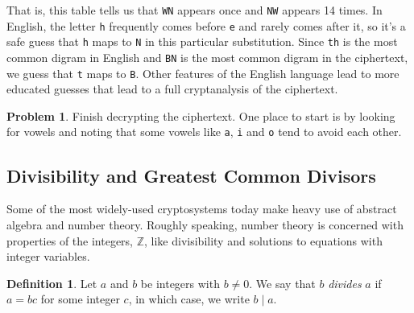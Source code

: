 \documentclass[12pt]{article}
\theoremstyle{plain}
\theoremstyle{definition}
\newtheorem{definition}[theorem]{Definition}
\newtheorem{problem}[theorem]{Problem}
\theoremstyle{remark}
\newcommand{\Z}{\mathbb{Z}}
\begin{document}
That is, this table tells us that \texttt{WN} appears once and \texttt{NW} appears 14 times.
In English, the letter \texttt{h} frequently comes before \texttt{e} and rarely comes after it, so it's a safe guess that \texttt{h} maps to \texttt{N} in this particular substitution.
Since \texttt{th} is the most common digram in English and \texttt{BN} is the most common digram in the ciphertext, we guess that \texttt{t} maps to \texttt{B}.
Other features of the English language lead to more educated guesses that lead to a full cryptanalysis of the ciphertext.

\begin{problem}
    Finish decrypting the ciphertext. One place to start is by looking for vowels and noting that some vowels like \texttt{a}, \texttt{i} and \texttt{o} tend to avoid each other.
\end{problem}











\subsection{Divisibility and Greatest Common Divisors}
Some of the most widely-used cryptosystems today make heavy use of abstract algebra and number theory.
Roughly speaking, number theory is concerned with properties of the integers, $\Z$, like divisibility and solutions to equations with integer variables.

\begin{definition}
    Let $a$ and $b$ be integers with $b\neq 0$. We say that $b$ \emph{divides} $a$ if $a=bc$ for some integer $c$, in which case, we write $b\mid a$.
\end{definition}
\end{document}
